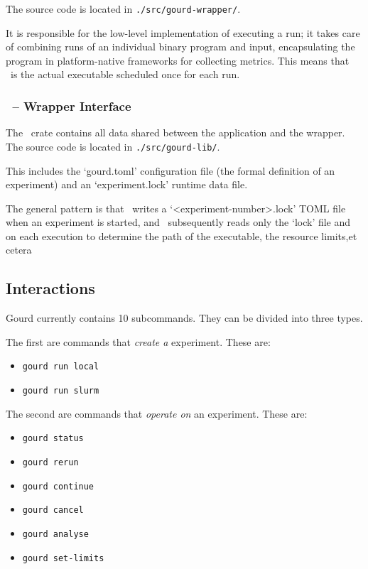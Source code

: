 The source code is located in \verb|./src/gourd-wrapper/|.

It is responsible for the low-level implementation of executing a run;
it takes care of combining runs of an individual binary program and input,
encapsulating the program in platform-native frameworks for collecting metrics.
This means that \gourdwrap\ is the actual executable scheduled once for each run.

\subsubsection{\gourdlib\ -- Wrapper Interface}

The \gourdlib\ crate contains all data shared between the application and the wrapper.
The source code is located in \verb|./src/gourd-lib/|.

This includes the `gourd.toml' configuration file (the formal definition of an experiment)
and an `experiment.lock' runtime data file.

The general pattern is that \gourd\ writes a `<experiment-number>.lock' TOML file when
an experiment is started, and \gourdwrap\ subsequently reads only the `lock' file and
on each execution to determine the path of the executable, the resource limits,et cetera

\subsection{Interactions}

Gourd currently contains 10 subcommands.
They can be divided into three types.

The first are commands that \emph{create a} experiment. These are:

\begin{itemize}
  \item \texttt{gourd run local}
  \item \texttt{gourd run slurm}
\end{itemize}

The second are commands that \emph{operate on} an experiment. These are:

\begin{itemize}
  \item \texttt{gourd status}
  \item \texttt{gourd rerun}
  \item \texttt{gourd continue}
  \item \texttt{gourd cancel}
  \item \texttt{gourd analyse}
  \item \texttt{gourd set-limits}
\end{itemize}


